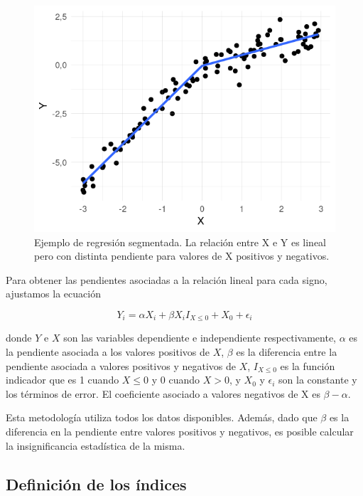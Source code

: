 \documentclass[12pt,oneside,a4paper]{reedthesis}
\begin{document}
\begin{figure}

{\centering \includegraphics{figures/30-sam/segmentada-ejemplo-1} 

}

\caption{Ejemplo de regresión segmentada. La relación entre X e Y es lineal pero con distinta pendiente para valores de X positivos y negativos.}\label{fig:segmentada-ejemplo}
\end{figure}



Para obtener las pendientes asociadas a la relación lineal para cada signo, ajustamos la ecuación

\[
Y_i = \alpha X_i + \beta X_iI_{X\le 0} + X_0 + \epsilon_i
\]

donde \(Y\) e \(X\) son las variables dependiente e independiente respectivamente, \(\alpha\) es la pendiente asociada a los valores positivos de \(X\), \(\beta\) es la diferencia entre la pendiente asociada a valores positivos y negativos de \(X\), \(I_{X\le 0}\) es la función indicador que es 1 cuando \(X\le0\) y 0 cuando \(X>0\), y \(X_0\) y \(\epsilon_i\) son la constante y los términos de error.
El coeficiente asociado a valores negativos de X es \(\beta - \alpha\).

Esta metodología utiliza todos los datos disponibles.
Además, dado que \(\beta\) es la diferencia en la pendiente entre valores positivos y negativos, es posible calcular la insignificancia estadística de la misma.

\hypertarget{definition-of-indices}{%
\subsection{Definición de los índices}\label{definition-of-indices}}
\end{document}
